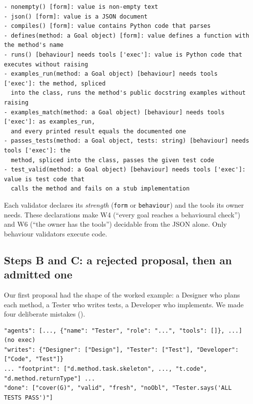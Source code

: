 \documentclass[10pt,a4paper]{article}
\newcommand{\W}[1]{\textsf{W#1}}
\newcommand{\code}[1]{\texttt{#1}}
\begin{document}
\begin{lstlisting}[style=llm, caption={Observed: the validator library as the builder prompt lists it.}, label={lst:vlib}]
- nonempty() [form]: value is non-empty text
- json() [form]: value is a JSON document
- compiles() [form]: value contains Python code that parses
- defines(method: a Goal object) [form]: value defines a function with the method's name
- runs() [behaviour] needs tools ['exec']: value is Python code that executes without raising
- examples_run(method: a Goal object) [behaviour] needs tools ['exec']: the method, spliced
  into the class, runs the method's public docstring examples without raising
- examples_match(method: a Goal object) [behaviour] needs tools ['exec']: as examples_run,
  and every printed result equals the documented one
- passes_tests(method: a Goal object, tests: string) [behaviour] needs tools ['exec']: the
  method, spliced into the class, passes the given test code
- test_valid(method: a Goal object) [behaviour] needs tools ['exec']: value is test code that
  calls the method and fails on a stub implementation
\end{lstlisting}

Each validator declares its \emph{strength} (\code{form} or
\code{behaviour}) and the tools its owner needs. These declarations make
\W{4} (``every goal reaches a behavioural check'') and \W{6} (``the owner has
the tools'') decidable from the JSON alone. Only behaviour validators execute
code.

\subsection{Steps B and C: a rejected proposal, then an admitted one}

Our first proposal had the shape of the worked example: a Designer who plans
each method, a Tester who writes tests, a Developer who implements. We made
four deliberate mistakes ().

\begin{lstlisting}[style=model, caption={Illustrative: the four faulty fragments of the first proposal.}, label={lst:w2bad}]
"agents": [..., {"name": "Tester", "role": "...", "tools": []}, ...]          (no exec)
"writes": {"Designer": ["Design"], "Tester": ["Test"], "Developer": ["Code", "Test"]}
... "footprint": ["d.method.task.skeleton", ..., "t.code", "d.method.returnType"] ...
"done": ["cover(G)", "valid", "fresh", "noObl", "Tester.says('ALL TESTS PASS')"]
\end{lstlisting}
\end{document}
